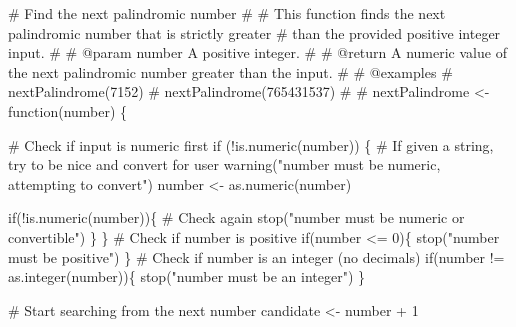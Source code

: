 \documentclass[
  letterpaper,
  DIV=11,
  numbers=noendperiod]{scrartcl}
\newenvironment{Shaded}{\begin{snugshade}}{\end{snugshade}}
\newcommand{\CommentTok}[1]{\textcolor[rgb]{0.37,0.37,0.37}{#1}}
\newcommand{\ControlFlowTok}[1]{\textcolor[rgb]{0.00,0.23,0.31}{#1}}
\newcommand{\DecValTok}[1]{\textcolor[rgb]{0.68,0.00,0.00}{#1}}
\newcommand{\FunctionTok}[1]{\textcolor[rgb]{0.28,0.35,0.67}{#1}}
\newcommand{\NormalTok}[1]{\textcolor[rgb]{0.00,0.23,0.31}{#1}}
\newcommand{\OtherTok}[1]{\textcolor[rgb]{0.00,0.23,0.31}{#1}}
\newcommand{\SpecialCharTok}[1]{\textcolor[rgb]{0.37,0.37,0.37}{#1}}
\newcommand{\StringTok}[1]{\textcolor[rgb]{0.13,0.47,0.30}{#1}}
\begin{document}
\begin{Shaded}
\begin{Highlighting}[]
\CommentTok{\#\textquotesingle{} Find the next palindromic number}
\CommentTok{\#\textquotesingle{}}
\CommentTok{\#\textquotesingle{} This function finds the next palindromic number that is strictly greater}
\CommentTok{\#\textquotesingle{} than the provided positive integer input.}
\CommentTok{\#\textquotesingle{}}
\CommentTok{\#\textquotesingle{} @param number A positive integer.}
\CommentTok{\#\textquotesingle{}}
\CommentTok{\#\textquotesingle{} @return A numeric value of the next palindromic number greater than the input.}
\CommentTok{\#\textquotesingle{} }
\CommentTok{\#\textquotesingle{} @examples}
\CommentTok{\#\textquotesingle{} nextPalindrome(7152)}
\CommentTok{\#\textquotesingle{} nextPalindrome(765431537)}
\CommentTok{\#\textquotesingle{} }
\CommentTok{\#\textquotesingle{} }
\NormalTok{nextPalindrome }\OtherTok{\textless{}{-}} \ControlFlowTok{function}\NormalTok{(number) \{}
  
  \CommentTok{\# Check if input is numeric first}
  \ControlFlowTok{if}\NormalTok{ (}\SpecialCharTok{!}\FunctionTok{is.numeric}\NormalTok{(number)) \{}
    \CommentTok{\# If given a string, try to be nice and convert for user}
    \FunctionTok{warning}\NormalTok{(}\StringTok{"number must be numeric, attempting to convert"}\NormalTok{)}
\NormalTok{    number }\OtherTok{\textless{}{-}} \FunctionTok{as.numeric}\NormalTok{(number) }
    
    \ControlFlowTok{if}\NormalTok{(}\SpecialCharTok{!}\FunctionTok{is.numeric}\NormalTok{(number))\{ }\CommentTok{\# Check again}
      \FunctionTok{stop}\NormalTok{(}\StringTok{"number must be numeric or convertible"}\NormalTok{)}
\NormalTok{    \}}
\NormalTok{  \}}
  \CommentTok{\# Check if number is positive}
  \ControlFlowTok{if}\NormalTok{(number }\SpecialCharTok{\textless{}=} \DecValTok{0}\NormalTok{)\{}
    \FunctionTok{stop}\NormalTok{(}\StringTok{"number must be positive"}\NormalTok{)}
\NormalTok{  \}}
  \CommentTok{\# Check if number is an integer (no decimals)}
  \ControlFlowTok{if}\NormalTok{(number }\SpecialCharTok{!=} \FunctionTok{as.integer}\NormalTok{(number))\{}
    \FunctionTok{stop}\NormalTok{(}\StringTok{"number must be an integer"}\NormalTok{)}
\NormalTok{  \}}
  
  \CommentTok{\# Start searching from the next number}
\NormalTok{  candidate }\OtherTok{\textless{}{-}}\NormalTok{ number }\SpecialCharTok{+} \DecValTok{1}
  

\end{Highlighting}
\end{Shaded}
\end{document}
